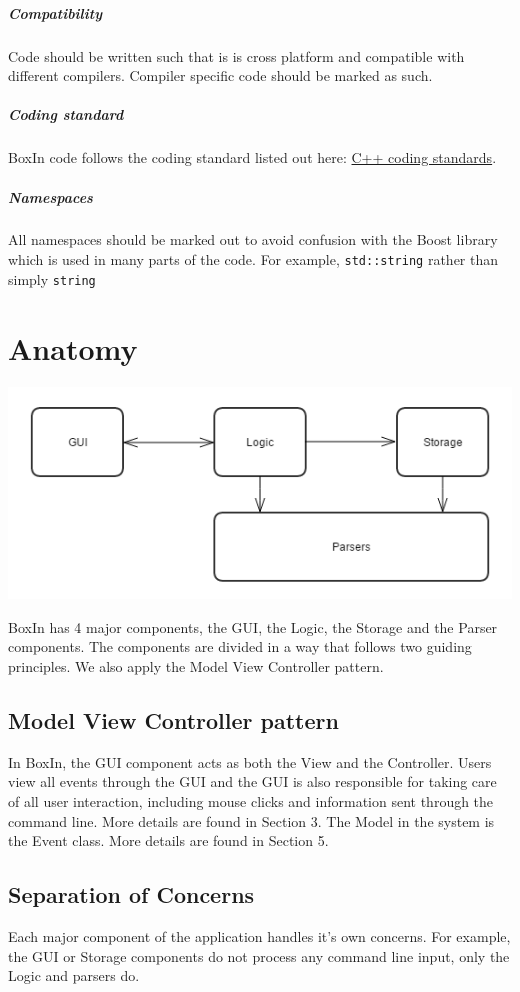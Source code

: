\documentclass[12pt]{extarticle}
\begin{document}
\subparagraph{Compatibility}
Code should be written such that is is cross platform and compatible with different compilers. Compiler specific code should be marked as such.

\subparagraph{Coding standard}
BoxIn code follows the coding standard listed out here: \href{https://docs.google.com/document/pub?id=1tJD2XQo3hUb0SZniswLqg0vkmccv7vGBV7\_1AhTYK04\&amp\&embedded=true}{C++ coding standards}.

\subparagraph{Namespaces}
All namespaces should be marked out to avoid confusion with the Boost library which is used in many parts of the code. For example, \texttt{std::string} rather than simply \texttt{string}\\
\newpage


\section{Anatomy}

\includegraphics[width=\textwidth]{architecture}

BoxIn has 4 major components, the GUI, the Logic, the Storage and the Parser components. The components are divided in a way that follows two guiding principles. We also apply the Model View Controller pattern.

\subsection{Model View Controller pattern}
In BoxIn, the GUI component acts as both the View and the Controller. Users view all events through the GUI and the GUI is also responsible for taking care of all user interaction, including mouse clicks and information sent through the command line. More details are found in Section 3.
The Model in the system is the Event class. More details are found in Section 5.

\subsection{Separation of Concerns}
Each major component of the application handles it's own concerns. For example, the GUI or Storage components do not process any command line input, only the Logic and parsers do.
\end{document}
